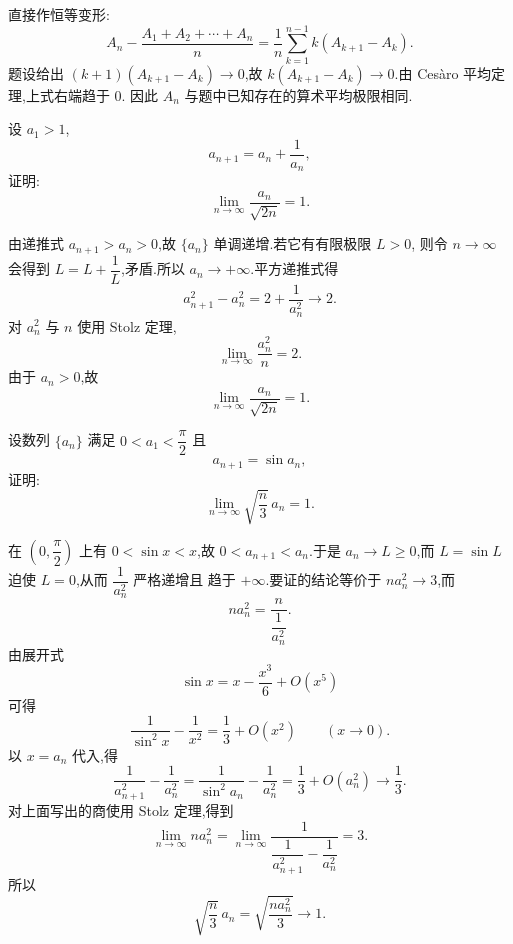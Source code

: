 \begin{solution}
  直接作恒等变形:
  \[
    A_n-\dfrac{A_1+A_2+\cdots+A_n}{n}
    =\dfrac{1}{n}\sum\limits_{k=1}^{n-1}k(A_{k+1}-A_k).
  \]
  题设给出 $(k+1)(A_{k+1}-A_k)\to0$,故
  $k(A_{k+1}-A_k)\to0$.由 Ces\`aro 平均定理,上式右端趋于 $0$.
  因此 $A_n$ 与题中已知存在的算术平均极限相同.
\end{solution}

\begin{example}
  设 $a_1>1$,
  \[
    a_{n+1}=a_n+\dfrac{1}{a_n},
  \]
  证明:
  \[
    \displaystyle\lim\limits_{n\to\infty}\dfrac{a_n}{\sqrt{2n}}=1.
  \]
\end{example}
\exampleblank

\begin{solution}
  由递推式 $a_{n+1}>a_n>0$,故 $\{a_n\}$ 单调递增.若它有有限极限 $L>0$,
  则令 $n\to\infty$ 会得到 $L=L+\dfrac{1}{L}$,矛盾.所以 $a_n\to+\infty$.平方递推式得
  \[
    a_{n+1}^2-a_n^2=2+\dfrac{1}{a_n^2}\longrightarrow2.
  \]
  对 $a_n^2$ 与 $n$ 使用 Stolz 定理,
  \[
    \displaystyle\lim\limits_{n\to\infty}\dfrac{a_n^2}{n}=2.
  \]
  由于 $a_n>0$,故
  \[
    \displaystyle\lim\limits_{n\to\infty}\dfrac{a_n}{\sqrt{2n}}=1.
  \]
\end{solution}

\begin{example}
  设数列 $\{a_n\}$ 满足 $0<a_1<\dfrac{\pi}{2}$ 且
  \[
    a_{n+1}=\sin a_n,
  \]
  证明:
  \[
    \displaystyle\lim\limits_{n\to\infty}\sqrt{\dfrac{n}{3}}\,a_n=1.
  \]
\end{example}
\exampleblank

\begin{solution}
  在 $\left(0,\dfrac{\pi}{2}\right)$ 上有 $0<\sin x<x$,故 $0<a_{n+1}<a_n$.于是
  $a_n\to L\geq0$,而 $L=\sin L$ 迫使 $L=0$,从而 $\dfrac{1}{a_n^2}$ 严格递增且
  趋于 $+\infty$.要证的结论等价于 $na_n^2\to3$,而
  \[
    na_n^2=\dfrac{n}{\dfrac{1}{a_n^2}}.
  \]
  由展开式
  \[
    \sin x=x-\dfrac{x^3}{6}+O(x^5)
  \]
  可得
  \[
    \dfrac{1}{\sin^2x}-\dfrac{1}{x^2}=\dfrac{1}{3}+O(x^2)
    \qquad(x\to0).
  \]
  以 $x=a_n$ 代入,得
  \[
    \dfrac{1}{a_{n+1}^2}-\dfrac{1}{a_n^2}
    =\dfrac{1}{\sin^2a_n}-\dfrac{1}{a_n^2}
    =\dfrac{1}{3}+O(a_n^2)\longrightarrow\dfrac{1}{3}.
  \]
  对上面写出的商使用 Stolz 定理,得到
  \[
    \displaystyle\lim\limits_{n\to\infty}na_n^2
    =\lim\limits_{n\to\infty}
    \dfrac{1}{\dfrac{1}{a_{n+1}^2}-\dfrac{1}{a_n^2}}
    =3.
  \]
  所以
  \[
    \sqrt{\dfrac{n}{3}}\,a_n
    =\sqrt{\dfrac{na_n^2}{3}}\longrightarrow1.
  \]
\end{solution}

